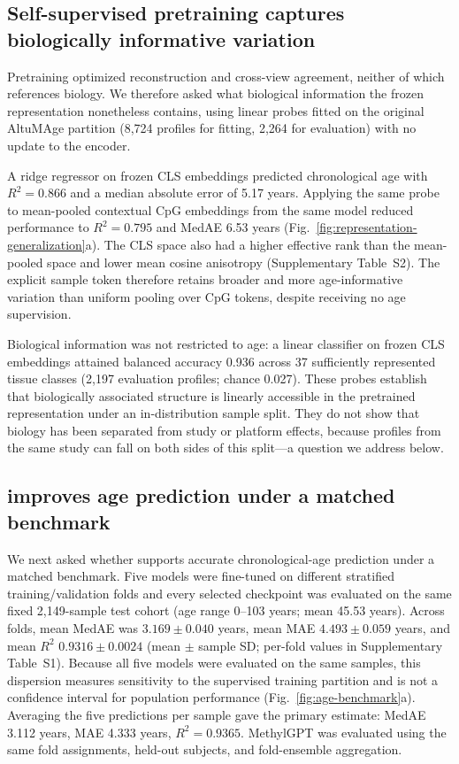 \subsection{Self-supervised pretraining captures biologically informative variation}

Pretraining optimized reconstruction and cross-view agreement, neither of which references
biology. We therefore asked what biological information the frozen representation nonetheless
contains, using linear probes fitted on the original AltuMAge partition (8,724 profiles for
fitting, 2,264 for evaluation) with no update to the encoder.

A ridge regressor on frozen CLS embeddings predicted chronological age with $R^2=0.866$ and a
median absolute error of 5.17 years. Applying the same probe to mean-pooled contextual CpG
embeddings from the same model reduced performance to $R^2=0.795$ and MedAE 6.53 years
(Fig.~\ref{fig:representation-generalization}a). The CLS space also had a higher effective rank
than the mean-pooled space and lower mean cosine anisotropy (Supplementary Table~S2). The
explicit sample token therefore retains broader and more age-informative variation than uniform
pooling over CpG tokens, despite receiving no age supervision.

Biological information was not restricted to age: a linear classifier on frozen CLS embeddings
attained balanced accuracy 0.936 across 37 sufficiently represented tissue classes (2,197
evaluation profiles; chance 0.027). These probes establish that biologically associated
structure is linearly accessible in the pretrained representation under an in-distribution
sample split. They do not show that biology has been separated from study or platform effects,
because profiles from the same study can fall on both sides of this split---a question we
address below.

\subsection{\method{} improves age prediction under a matched benchmark}

We next asked whether \method{} supports accurate chronological-age prediction under a matched
benchmark. Five models were fine-tuned on different stratified
training/validation folds and every selected checkpoint was evaluated on the same fixed
2,149-sample test cohort (age range 0--103 years; mean 45.53 years). Across folds, mean MedAE
was $3.169\pm0.040$ years, mean MAE $4.493\pm0.059$ years, and mean $R^2$ $0.9316\pm0.0024$
(mean $\pm$ sample SD; per-fold values in Supplementary Table~S1). Because all five models were
evaluated on the same samples, this dispersion measures sensitivity to the supervised training
partition and is not a confidence interval for population performance
(Fig.~\ref{fig:age-benchmark}a). Averaging the five predictions per sample gave the primary
\method{} estimate: MedAE 3.112 years, MAE 4.333 years, $R^2=0.9365$. MethylGPT was evaluated
using the same fold assignments, held-out subjects, and fold-ensemble aggregation.

